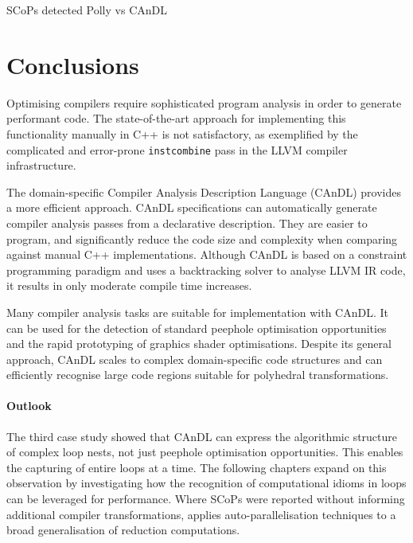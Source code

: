 \begin{table}[ht]
    
    \caption{SCoPs detected Polly vs CAnDL}
    \label{fig:candlvspolly}
\end{table}

\section{Conclusions}

    Optimising compilers require sophisticated program analysis in order to
    generate performant code.
    The state-of-the-art approach for implementing this functionality manually
    in C++ is not satisfactory, as exemplified by the complicated and
    error-prone {\tt instcombine} pass in the LLVM compiler infrastructure.

    The domain-specific Compiler Analysis Description Language (CAnDL) provides
    a more efficient approach.
    CAnDL specifications can automatically generate compiler analysis
    passes from a declarative description.
    They are easier to program, and significantly reduce the code size and
    complexity when comparing against manual C++ implementations.
    Although CAnDL is based on a constraint programming paradigm and uses a
    backtracking solver to analyse LLVM IR code, it results in only moderate
    compile time increases.

    Many compiler analysis tasks are suitable for implementation with CAnDL.
    It can be used for the detection of standard peephole optimisation
    opportunities and the rapid prototyping of graphics shader optimisations.
    Despite its general approach, CAnDL scales to complex domain-specific code
    structures and can efficiently recognise large code regions suitable for
    polyhedral transformations.

    \paragraph*{Outlook}
    The third case study showed that CAnDL can express the algorithmic structure
    of complex loop nests, not just peephole optimisation opportunities.
    This enables the capturing of entire loops at a time.
    The following chapters expand on this observation by investigating how the
    recognition of computational idioms in loops can be leveraged for
    performance.
    Where SCoPs were reported without informing additional compiler
    transformations,  applies auto-parallelisation
    techniques to a broad generalisation of reduction computations.
